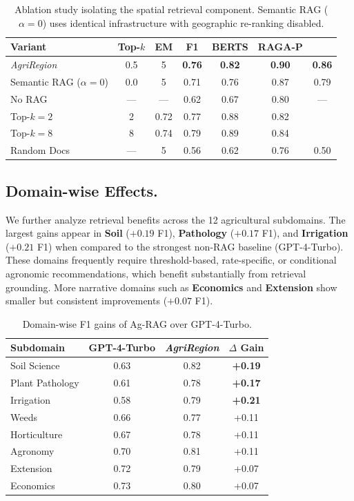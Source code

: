 \documentclass{ieeeaccess}
\newcommand{\AgriRegion}{\textit{AgriRegion}}
\begin{document}
\begin{table}[!t]
\centering
\caption{Ablation study isolating the spatial retrieval component. Semantic RAG ($\alpha{=}0$) uses identical infrastructure with geographic re-ranking disabled.}
\label{tab:ablation}
\setlength{\tabcolsep}{5pt}
\renewcommand{\arraystretch}{1.0}
\begin{tabular}{lcccccc}
\toprule
\textbf{Variant} & Top-$k$ & EM & F1 & BERTS & RAGA-P \\
\midrule
\AgriRegion~ & 0.5 & 5 & \textbf{0.76} & \textbf{0.82} & \textbf{0.90} & \textbf{0.86} \\
Semantic RAG ($\alpha{=}0$) & 0.0 & 5 & 0.71 & 0.76 & 0.87 & 0.79 \\
No RAG & --- & --- & 0.62 & 0.67 & 0.80 & --- \\
Top-$k{=}2$ & 2 & 0.72 & 0.77 & 0.88 & 0.82 \\
Top-$k{=}8$ & 8 & 0.74 & 0.79 & 0.89 & 0.84 \\
Random Docs & --- & 5 & 0.56 & 0.62 & 0.76 & 0.50 \\
\bottomrule
\end{tabular}
\end{table}

\subsection{Domain-wise Effects.}
We further analyze retrieval benefits across the 12 agricultural subdomains. 
The largest gains appear in \textbf{Soil} (\(+0.19\) F1), \textbf{Pathology} (\(+0.17\) F1), and \textbf{Irrigation} (\(+0.21\) F1) when compared to the strongest non-RAG baseline (GPT-4-Turbo). 
These domains frequently require threshold-based, rate-specific, or conditional agronomic recommendations, which benefit substantially from retrieval grounding. 
More narrative domains such as \textbf{Economics} and \textbf{Extension} show smaller but consistent improvements (\(+0.07\) F1).

\begin{table}[h]
\centering
\caption{Domain-wise F1 gains of Ag-RAG over GPT-4-Turbo.}
\begin{tabular}{lccc}
\toprule
Subdomain & GPT-4-Turbo & \AgriRegion & $\Delta$ Gain \\
\midrule
Soil Science     & 0.63 & 0.82 & \textbf{+0.19} \\
Plant Pathology  & 0.61 & 0.78 & \textbf{+0.17} \\
Irrigation       & 0.58 & 0.79 & \textbf{+0.21} \\
Weeds            & 0.66 & 0.77 & +0.11 \\
Horticulture     & 0.67 & 0.78 & +0.11 \\
Agronomy         & 0.70 & 0.81 & +0.11 \\
Extension        & 0.72 & 0.79 & +0.07 \\
Economics        & 0.73 & 0.80 & +0.07 \\
\bottomrule
\end{tabular}
\label{tab:domain_gains}
\end{table}
\end{document}

